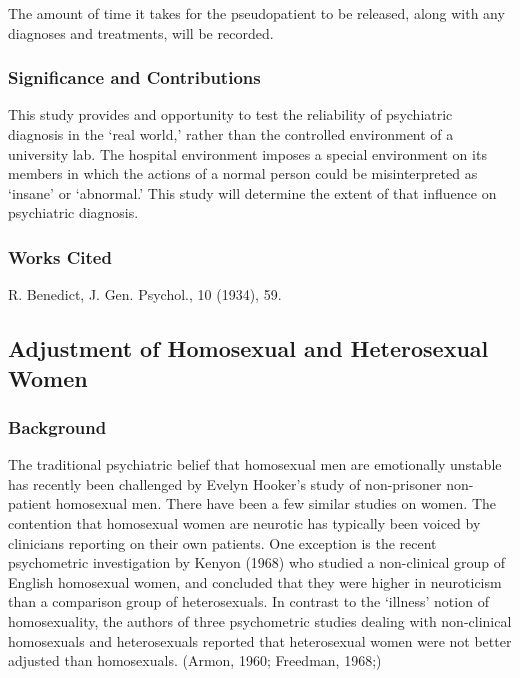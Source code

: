 \begin{refsection}
The amount of time it takes for the pseudopatient to be released, along with any diagnoses and treatments, will be recorded.

\subsubsection{Significance and Contributions}
\label{significanceandcontributions}

This study provides and opportunity to test the reliability of psychiatric diagnosis in the `real world,' rather than the controlled environment of a university lab. The hospital environment imposes a special environment on its members in which the actions of a normal person could be misinterpreted as `insane' or `abnormal.' This study will determine the extent of that influence on psychiatric diagnosis.

\subsubsection{Works Cited}
\label{workscited}

R. Benedict, J. Gen. Psychol., 10 (1934), 59.

\newpage

\subsection{Adjustment of Homosexual and Heterosexual Women}
\label{adjustmentofhomosexualandheterosexualwomen}

\subsubsection{Background}
\label{background}

The traditional psychiatric belief that homosexual men are emotionally unstable has recently been challenged by Evelyn Hooker's study of non-prisoner non-patient homosexual men. There have been a few similar studies on women. The contention that homosexual women are neurotic has typically been voiced by clinicians reporting on their own patients. One exception is the recent psychometric investigation by Kenyon (1968) who studied a non-clinical group of English homosexual women, and concluded that they were higher in neuroticism than a comparison group of heterosexuals. In contrast to the `illness' notion of homosexuality, the authors of three psychometric studies dealing with non-clinical homosexuals and heterosexuals reported that heterosexual women were not better adjusted than homosexuals. (Armon, 1960; Freedman, 1968;)


\end{refsection}
